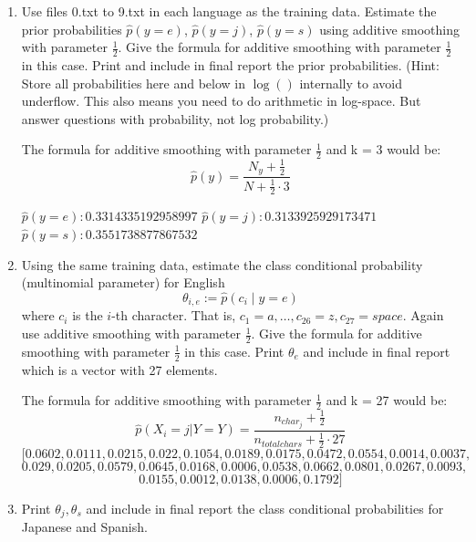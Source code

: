 \documentclass[a4paper]{article}
\theoremstyle{definition}
\newenvironment{soln}{
    \leavevmode\color{blue}\ignorespaces
}{}
\begin{document}
\begin{enumerate}
\item
Use files 0.txt to 9.txt in each language as the training data.
Estimate the prior probabilities 
$\hat p(y=e)$,
$\hat p(y=j)$,
$\hat p(y=s)$
using additive smoothing with parameter $\frac{1}{2}$. 
Give the formula for additive smoothing with parameter $\frac{1}{2}$ in this case. 
Print and include in final report the prior probabilities.
(Hint: Store all probabilities here and below in $\log()$ internally to avoid underflow. This also means you need to do arithmetic in log-space.  But answer questions with probability, not log probability.)

\begin{soln}
    The formula for additive smoothing with parameter $\frac{1}{2}$ and k = 3 would be:
        $$\hat p(y) = \frac{N_y + \frac{1}{2}}{N + \frac{1}{2} \cdot 3}$$

    $\hat p(y=e): 0.3314335192958997$
    $\hat p(y=j): 0.3133925929173471$
    $\hat p(y=s): 0.3551738877867532$
\end{soln}

\item
Using the same training data, estimate the class conditional probability (multinomial parameter) for English
$$\theta_{i,e} := \hat p(c_i \mid y=e)$$ 
where $c_i$ is the $i$-th character. That is, $c_1 = a, \ldots, c_{26} = z, c_{27} = space$.
Again use additive smoothing with parameter $\frac{1}{2}$.
Give the formula for additive smoothing with parameter $\frac{1}{2}$ in this case. 
Print $\theta_e$ and include in final report which is a vector with 27 elements.

\begin{soln}
    The formula for additive smoothing with parameter $\frac{1}{2}$ and k = 27 would be:
        $$\hat p(X_{i} = j|Y = Y) = \frac{n_{char_j} + \frac{1}{2}}{n_{totalchars} + \frac{1}{2} \cdot 27}$$
        $$ [0.0602, 0.0111, 0.0215, 0.022, 0.1054, 0.0189, 0.0175, 0.0472, 0.0554, 0.0014, 0.0037, $$
        $$ 0.029, 0.0205, 0.0579, 0.0645, 0.0168, 0.0006, 0.0538, 0.0662, 0.0801, 0.0267, 0.0093,  $$
        $$0.0155, 0.0012, 0.0138, 0.0006, 0.1792]$$
\end{soln}


\item
Print $\theta_j, \theta_s$ and include in final report the class conditional probabilities for Japanese and Spanish.

\begin{soln}


\end{soln}
\end{enumerate}
\end{document}
